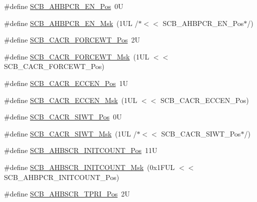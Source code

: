 \begin{DoxyCompactItemize}
\#define \mbox{\hyperlink{group___c_m_s_i_s___s_c_b_ga1048eb341b71c712a1a8aedf4eedffe0}{S\+C\+B\+\_\+\+A\+H\+B\+P\+C\+R\+\_\+\+E\+N\+\_\+\+Pos}}~0U
\item 
\#define \mbox{\hyperlink{group___c_m_s_i_s___s_c_b_ga770da9a88e66adb62645f625b0a095cb}{S\+C\+B\+\_\+\+A\+H\+B\+P\+C\+R\+\_\+\+E\+N\+\_\+\+Msk}}~(1\+U\+L /$\ast$$<$$<$ S\+C\+B\+\_\+\+A\+H\+B\+P\+C\+R\+\_\+\+E\+N\+\_\+\+Pos$\ast$/)
\item 
\#define \mbox{\hyperlink{group___c_m_s_i_s___s_c_b_ga9f1abd30b202418a920255dcd1d87d5f}{S\+C\+B\+\_\+\+C\+A\+C\+R\+\_\+\+F\+O\+R\+C\+E\+W\+T\+\_\+\+Pos}}~2U
\item 
\#define \mbox{\hyperlink{group___c_m_s_i_s___s_c_b_ga0fd9cfb1ef8f44e3edc66fd52309fa7f}{S\+C\+B\+\_\+\+C\+A\+C\+R\+\_\+\+F\+O\+R\+C\+E\+W\+T\+\_\+\+Msk}}~(1\+U\+L $<$$<$ S\+C\+B\+\_\+\+C\+A\+C\+R\+\_\+\+F\+O\+R\+C\+E\+W\+T\+\_\+\+Pos)
\item 
\#define \mbox{\hyperlink{group___c_m_s_i_s___s_c_b_ga76ce5adcbed2d2d8d425214a1e5d0579}{S\+C\+B\+\_\+\+C\+A\+C\+R\+\_\+\+E\+C\+C\+E\+N\+\_\+\+Pos}}~1U
\item 
\#define \mbox{\hyperlink{group___c_m_s_i_s___s_c_b_ga7456a0b93710e8b9fa2b94c946e96c5c}{S\+C\+B\+\_\+\+C\+A\+C\+R\+\_\+\+E\+C\+C\+E\+N\+\_\+\+Msk}}~(1\+U\+L $<$$<$ S\+C\+B\+\_\+\+C\+A\+C\+R\+\_\+\+E\+C\+C\+E\+N\+\_\+\+Pos)
\item 
\#define \mbox{\hyperlink{group___c_m_s_i_s___s_c_b_gafda198ad429d0a5c865e75d42afa12a2}{S\+C\+B\+\_\+\+C\+A\+C\+R\+\_\+\+S\+I\+W\+T\+\_\+\+Pos}}~0U
\item 
\#define \mbox{\hyperlink{group___c_m_s_i_s___s_c_b_ga00625442f92069da7604a420bafdbd23}{S\+C\+B\+\_\+\+C\+A\+C\+R\+\_\+\+S\+I\+W\+T\+\_\+\+Msk}}~(1\+U\+L /$\ast$$<$$<$ S\+C\+B\+\_\+\+C\+A\+C\+R\+\_\+\+S\+I\+W\+T\+\_\+\+Pos$\ast$/)
\item 
\#define \mbox{\hyperlink{group___c_m_s_i_s___s_c_b_ga47f55c7d1b161535caff50e7a35dc734}{S\+C\+B\+\_\+\+A\+H\+B\+S\+C\+R\+\_\+\+I\+N\+I\+T\+C\+O\+U\+N\+T\+\_\+\+Pos}}~11U
\item 
\#define \mbox{\hyperlink{group___c_m_s_i_s___s_c_b_gabb766ac9d99ea8272387b6946e80ce43}{S\+C\+B\+\_\+\+A\+H\+B\+S\+C\+R\+\_\+\+I\+N\+I\+T\+C\+O\+U\+N\+T\+\_\+\+Msk}}~(0x1\+F\+U\+L $<$$<$ S\+C\+B\+\_\+\+A\+H\+B\+P\+C\+R\+\_\+\+I\+N\+I\+T\+C\+O\+U\+N\+T\+\_\+\+Pos)
\item 
\#define \mbox{\hyperlink{group___c_m_s_i_s___s_c_b_gabf98193e45e8bcb57caa28e8dc6df199}{S\+C\+B\+\_\+\+A\+H\+B\+S\+C\+R\+\_\+\+T\+P\+R\+I\+\_\+\+Pos}}~2U
\item 
$$
\end{DoxyCompactItemize}
